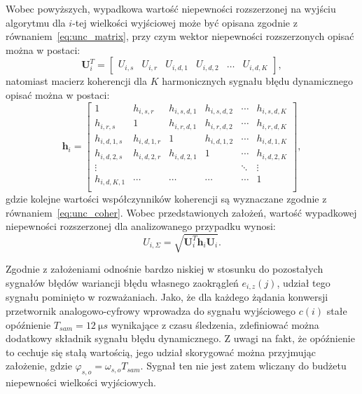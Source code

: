 Wobec powyższych, wypadkowa wartość niepewności rozszerzonej na wyjściu algorytmu dla $i$-tej wielkości wyjściowej może być opisana zgodnie z równaniem~\eqref{eq:unc_matrix}, przy czym wektor niepewności rozszerzonych opisać można w postaci:
\begin{equation}
\mathbf{U}_{i}^{T} =
\begin{bmatrix}
U_{i,s} & U_{i,r} & U_{i,d,1} & U_{i,d,2} & \hdots & U_{i,d,K}
\end{bmatrix}
\label{eq:pom_uncout_uncvect},
\end{equation}
natomiast macierz koherencji dla $K$ harmonicznych sygnału błędu dynamicznego opisać można w postaci:
\begin{equation}
\mathbf{h}_{i} =
\begin{bmatrix}
1           & h_{i,s,r}   & h_{i,s,d,1} & h_{i,s,d,2} & \cdots & h_{i,s,d,K} \\
h_{i,r,s}   & 1           & h_{i,r,d,1} & h_{i,r,d,2} & \cdots & h_{i,r,d,K} \\
h_{i,d,1,s} & h_{i,d,1,r} & 1           & h_{i,d,1,2} & \cdots & h_{i,d,1,K} \\
h_{i,d,2,s} & h_{i,d,2,r} & h_{i,d,2,1} & 1           & \cdots & h_{i,d,2,K} \\
\vdots      &             &             &             & \ddots & \vdots      \\
h_{i,d,K,1} & \cdots      & \cdots      & \cdots      & \cdots & 1           \\
\end{bmatrix}
\label{eq:pom_uncout_cohers},
\end{equation}
gdzie kolejne wartości współczynników koherencji są wyznaczane zgodnie z równaniem~\eqref{eq:unc_coher}. Wobec przedstawionych założeń, wartość wypadkowej niepewności rozszerzonej dla analizowanego przypadku wynosi:
\begin{equation}
U_{i,\Sigma} = \sqrt{\mathbf{U}_{i}^{T} \mathbf{h}_{i} \mathbf{U}_{i}} \label{eq:pom_uncout_sum}.
\end{equation}

Zgodnie z założeniami odnośnie bardzo niskiej w stosunku do pozostałych sygnałów błędów wariancji błędu własnego zaokrągleń $e_{i,z}(j)$, udział tego sygnału pominięto w rozważaniach. Jako, że dla każdego żądania konwersji przetwornik analogowo-cyfrowy wprowadza do sygnału wyjściowego $c(i)$ stałe opóźnienie $T_{sam} = \qty{12}{\micro s}$ wynikające z czasu śledzenia, zdefiniować można dodatkowy składnik sygnału błędu dynamicznego. Z uwagi na fakt, że opóźnienie to cechuje się stałą wartością, jego udział skorygować można przyjmując założenie, gdzie $\varphi_{s,o} = \omega_{s,o} T_{sam}$. Sygnał ten nie jest zatem wliczany do budżetu niepewności wielkości wyjściowych.

